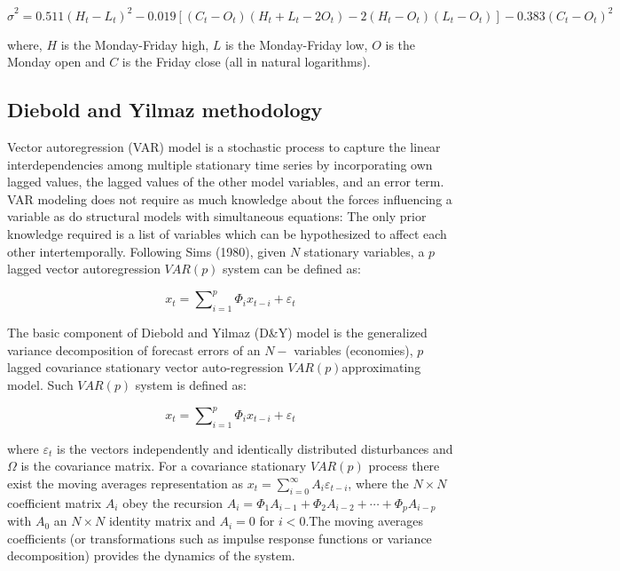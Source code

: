 \documentclass[]{elsarticle} %
\begin{document}
\[{{\hat{\sigma }}^{2}}=0.511{{\left( {{H}_{t}}-{{L}_{t}} \right)}^{2}}-0.019\left[ \left( {{C}_{t}}-{{O}_{t}} \right)\left( {{H}_{t}}+{{L}_{t}}-2{{O}_{t}} \right)-2\left( {{H}_{t}}-{{O}_{t}} \right)\left( {{L}_{t}}-{{O}_{t}} \right) \right]-0.383{{\left( {{C}_{t}}-{{O}_{t}} \right)}^{2}}\]

where, \(H\) is the Monday-Friday high, \(L\) is the Monday-Friday low,
\(O\) is the Monday open and \(C\) is the Friday close (all in natural
logarithms).

\subsection{Diebold and Yilmaz
methodology}\label{diebold-and-yilmaz-methodology}

Vector autoregression (VAR) model is a stochastic process to capture the
linear interdependencies among multiple stationary time series by
incorporating own lagged values, the lagged values of the other model
variables, and an error term. VAR modeling does not require as much
knowledge about the forces influencing a variable as do structural
models with simultaneous equations: The only prior knowledge required is
a list of variables which can be hypothesized to affect each other
intertemporally. Following Sims (1980), given \(N\) stationary
variables, a \(p\) lagged vector autoregression \(VAR\left( p \right)\)
system can be defined as:

\[{{x}_{t}}=\sum\nolimits_{i=1}^{p}{{{\Phi }_{i}}{{x}_{t-i}}+{{\varepsilon }_{t}}}\]

The basic component of Diebold and Yilmaz (D\&Y) model is the
generalized variance decomposition of forecast errors of an \(N-\)
variables (economies), \(p\) lagged covariance stationary vector
auto-regression \(VAR\left( p \right)\)approximating model. Such
\(VAR\left( p \right)\) system is defined as:

\[{{x}_{t}}=\sum\nolimits_{i=1}^{p}{{{\Phi }_{i}}{{x}_{t-i}}+{{\varepsilon }_{t}}}\]

where \({{\varepsilon }_{t}}\) is the vectors independently and
identically distributed disturbances and \(\Omega\) is the covariance
matrix. For a covariance stationary \(VAR\left( p \right)\) process
there exist the moving averages representation as
\({{x}_{t}}=\sum\nolimits_{i=0}^{\infty }{{{A}_{i}}{{\varepsilon }_{t-i}}}\),
where the \(N\times N\) coefficient matrix \({{A}_{i}}\) obey the
recursion
\({{A}_{i}}={{\Phi }_{1}}{{A}_{i-1}}+{{\Phi }_{2}}{{A}_{i-2}}+\cdots +{{\Phi }_{p}}{{A}_{i-p}}\)
with \({{A}_{0}}\) an \(N\times N\) identity matrix and \({{A}_{i}}=0\)
for \(i<0\).The moving averages coefficients (or transformations such as
impulse response functions or variance decomposition) provides the
dynamics of the system.
\end{document}
